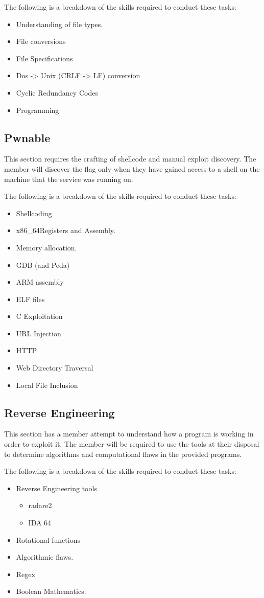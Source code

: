 \documentclass[a4paper,11pt]{report}
\begin{document}
			The following is a breakdown of the skills required to conduct these tasks:
			\begin{itemize}
				\item Understanding of file types. 
				\item File conversions
				\item File Specifications
				\item Dos -> Unix (CRLF -> LF) conversion
				\item Cyclic Redundancy Codes
				\item Programming
			\end{itemize}

		\subsection{Pwnable}
			This section requires the crafting of shellcode and manual exploit discovery. 
			The member will discover the flag only when they have gained access to a shell on the machine that the service was running on. 

			The following is a breakdown of the skills required to conduct these tasks:
			\begin{itemize}
				\item Shellcoding
				\item x86\_64Registers and Assembly. 
				\item Memory allocation. 
				\item GDB (and Peda)
				\item ARM assembly
				\item ELF files
				\item C Exploitation
				\item URL Injection
				\item HTTP
				\item Web Directory Traversal
				\item Local File Inclusion
			\end{itemize}
		\subsection{Reverse Engineering}
			This section has a member attempt to understand how a program is working in order to exploit it. 
			The member will be required to use the tools at their disposal to determine algorithms and computational flaws in the provided programs. 

			The following is a breakdown of the skills required to conduct these tasks:
			\begin{itemize}
				\item Reverse Engineering tools
					\begin{itemize}
						\item radare2
						\item IDA 64
					\end{itemize}
				\item Rotational functions
				\item Algorithmic flaws. 
				\item Regex
				\item Boolean Mathematics. 
			\end{itemize}
	
\end{document}
